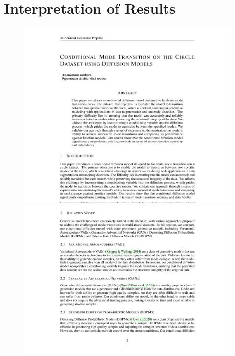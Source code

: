 \section{Interpretation of Results}
\begin{figure}[t]
    \centering
    \begin{minipage}{0.48\textwidth}
       \hspace{-1cm} \includegraphics[width=1.2\textwidth]{images/paper1.png}
    \end{minipage}
    \hfill
    \begin{minipage}{0.48\textwidth}
        \hspace{-1cm} \includegraphics[width=1.2\textwidth]{images/paper2.png}

\end{minipage}
\end{figure}
